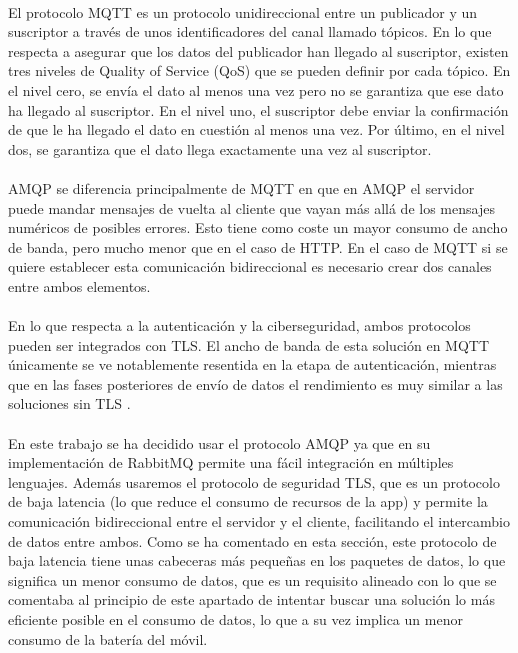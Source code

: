 \paragraph{}
El protocolo MQTT es un protocolo unidireccional entre un publicador y un suscriptor a través de unos identificadores del canal llamado tópicos. En lo que respecta a asegurar que los datos del publicador han llegado al suscriptor, existen tres niveles de Quality of Service (QoS) que se pueden definir por cada tópico. En el nivel cero, se envía el dato al menos una vez pero no se garantiza que ese dato ha llegado al suscriptor. En el nivel uno, el suscriptor debe enviar la confirmación de que le ha llegado el dato en cuestión al menos una vez. Por último, en el nivel dos, se garantiza que el dato llega exactamente una vez al suscriptor.

\paragraph{}
AMQP se diferencia principalmente de MQTT en que en AMQP el servidor puede mandar mensajes de vuelta al cliente que vayan más allá de los mensajes numéricos de posibles errores. Esto tiene como coste un mayor consumo de ancho de banda, pero mucho menor que en el caso de HTTP. En el caso de MQTT si se quiere establecer esta comunicación bidireccional es necesario crear dos canales entre ambos elementos.

\paragraph{}
En lo que respecta a la autenticación y la ciberseguridad, ambos protocolos pueden ser integrados con TLS. El ancho de banda de esta solución en MQTT únicamente se ve notablemente resentida en la etapa de autenticación, mientras que en las fases posteriores de envío de datos el rendimiento es muy similar a las soluciones sin TLS \citep{hivemq}.

\paragraph{}
En este trabajo se ha decidido usar el protocolo AMQP ya que en su implementación de RabbitMQ permite una fácil integración en múltiples lenguajes. Además usaremos el protocolo de seguridad TLS, que es un protocolo de baja latencia (lo que reduce el consumo de recursos de la app) y permite la comunicación bidireccional entre el servidor y el cliente, facilitando el intercambio de datos entre ambos. Como se ha comentado en esta sección, este protocolo de baja latencia tiene unas cabeceras más pequeñas en los paquetes de datos, lo que significa un menor consumo de datos, que es un requisito alineado con lo que se comentaba al principio de este apartado de intentar buscar una solución lo más eficiente posible en el consumo de datos, lo que a su vez implica un menor consumo de la batería del móvil.

